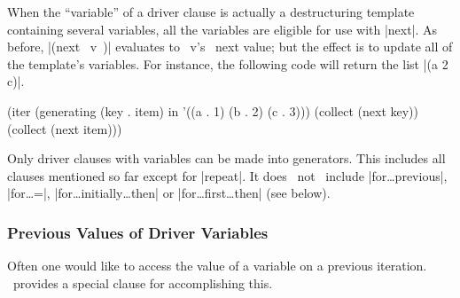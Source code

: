 When the ``variable'' of a driver clause is actually a destructuring
template containing several variables, all the variables are eligible
for use with |next|.  As before, |(next ~v~)| evaluates to ~v's~ next
value; but the effect is to update all of the template's variables.
For instance, the following code will return the list |(a 2 c)|.
\begin{program}
(iter (generating (key . item) in '((a . 1) (b . 2) (c . 3)))
      (collect (next key))
      (collect (next item)))
\end{program}

Only driver clauses with variables can be made into generators.  This
includes all clauses mentioned so far except for |repeat|.  It does
~not~ include |for\dots previous|, |for\dots =|,
|for\dots initially\dots then| or |for\dots first\dots then| (see
below).

\subsubsection{Previous Values of Driver Variables}

Often one would like to access the value of a variable on a previous
iteration.  \iter\ provides a special clause for accomplishing this.

